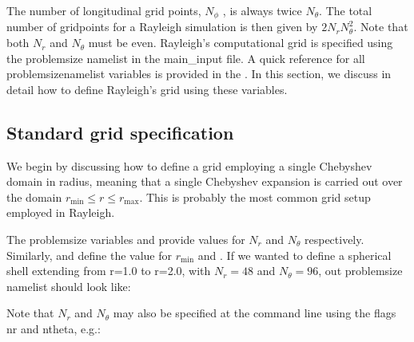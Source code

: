 \documentclass[letterpaper,11pt,english]{sphinxmanual}
\begin{document}
\sphinxAtStartPar
The number of longitudinal grid points, \(N_\phi\) , is always twice \(N_\theta\).
The total number of gridpoints for a Rayleigh simulation is then given by \(2N_rN_\theta^2\).
Note that both \(N_r\) and \(N_\theta\) must be even.   Rayleigh’s computational grid is specified using the problemsize namelist in the main\_input file.
A quick reference for all problemsize\sphinxhyphen{}namelist variables is provided in the {\hyperref[\detokenize{doc/source/Namelist_Definitions/Namelist_Variables:namelists}]{}}.  In this section, we discuss in detail how to define
Rayleigh’s grid using these variables.


\subsection{Standard grid specification}
\label{\detokenize{doc/source/Model_Setup/grid_specification:standard-grid-specification}}
\sphinxAtStartPar
We begin by discussing how to define a grid employing a single Chebyshev domain in radius, meaning that a single Chebyshev expansion is carried out over the domain
\(r_\mathrm{min} \le r \le r_\mathrm{max}\).  This is probably the most common grid setup employed in Rayleigh.

\sphinxAtStartPar
The problemsize variables  and  provide values
for \(N_r\) and \(N_\theta\) respectively.  Similarly,  and  define the value for \(r_\mathrm{min}\) and .
If we wanted to define a spherical shell extending from r=1.0 to r=2.0, with \(N_r=48\) and \(N_\theta=96\),
out problemsize namelist should look like:

\begin{sphinxVerbatim}[commandchars=\\\{\}]
   
   
   
   
\end{sphinxVerbatim}

\sphinxAtStartPar
Note that \(N_r\) and \(N_\theta\) may also be specified at the command
line using the flags \sphinxhyphen{}nr and \sphinxhyphen{}ntheta, e.g.:

\begin{sphinxVerbatim}[commandchars=\\\{\}]
       
\end{sphinxVerbatim}
\end{document}
